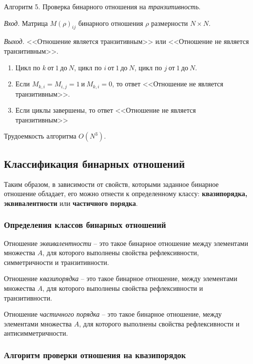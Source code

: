 \documentclass[bachelor, och, labwork]{shiza}
\begin{document}
Алгоритм 5. Проверка бинарного отношения на \textit{транзитивность}.

\textit{Вход.} Матрица $M(\rho)_{ij}$ бинарного отношения $\rho$ размерности
$N \times N$.

\textit{Выход.} <<Отношение является транзитивным>> или <<Отношение не является
транзитивным>>.

\begin{enumerate}
    
    \item Цикл по $k ~\text{от}~ 1 ~\text{до}~ N$, 
    цикл по $i ~\text{от}~ 1 ~\text{до}~ N$, цикл по $j ~\text{от}~ 1 ~\text{до}~ N$.
    
    \item Если $M_{k,i}=M_{i,j}=1 ~\text{и}~ M_{k,i}=0$, то ответ <<Отношение не является
    транзитивным>>.
   
    \item Если циклы завершены, то ответ <<Отношение не является транзитивным>>

\end{enumerate}
Трудоемкость алгоритма $O(N^3)$.

\subsection{Классификация бинарных отношений}

Таким образом, в зависимости от свойств, которыми заданное бинарное отношение
обладает, его можно отнести к определенному классу: \textbf{квазипорядка,
эквивалентности} или \textbf{частичного порядка}. 

\subsubsection{Определения классов бинарных отношений}

Отношение \textit{эквивалентности} -- это такое бинарное отношение между элементами
множества $A$, для которого выполнены свойства рефлексивности, симметричности 
и транзитивности.

Отношение \textit{квазипорядка} -- это такое бинарное отношение, между элементами
множества $A$, для которого выполнены свойства рефлексивности и транзитивности.

Отношение \textit{частичного порядка} -- это такое бинарное отношение, между
элементами множества $A$, для которого выполнены свойства рефлексивности и
антисимметричности.

\subsubsection{Алгоритм проверки отношения на квазипорядок}
\end{document}
